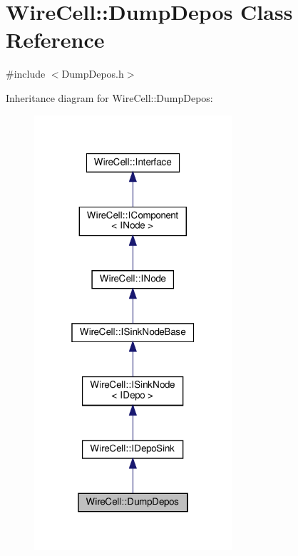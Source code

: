 \hypertarget{class_wire_cell_1_1_dump_depos}{}\section{Wire\+Cell\+:\+:Dump\+Depos Class Reference}
\label{class_wire_cell_1_1_dump_depos}


{\ttfamily \#include $<$Dump\+Depos.\+h$>$}



Inheritance diagram for Wire\+Cell\+:\+:Dump\+Depos\+:
\nopagebreak
\begin{figure}[H]
\begin{center}
\leavevmode
\includegraphics[width=208pt]{class_wire_cell_1_1_dump_depos__inherit__graph}
\end{center}
\end{figure}


